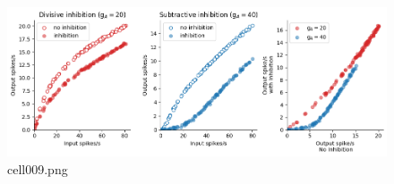\begin{figure}[ht]
	\centering
	\includegraphics[scale=0.8, max width=\linewidth]{./fig/neuronal-computation/neuronal-arithmetic/cell009.png}
	\caption{cell009.png}
	\label{cell009.png}
\end{figure}
